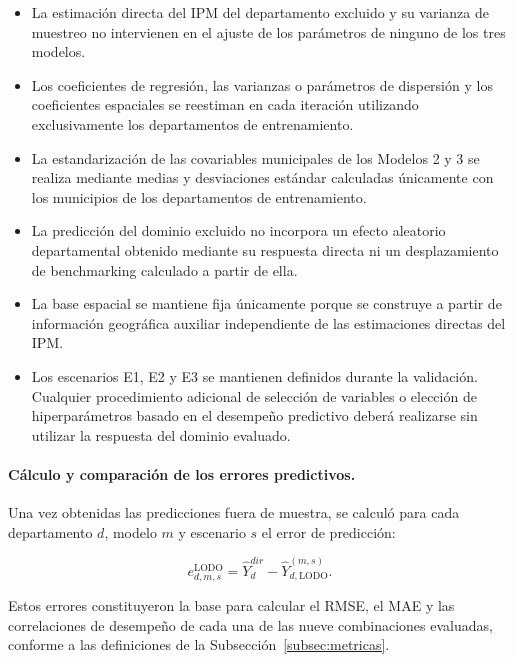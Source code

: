 \begin{itemize}
    \item La estimación directa del IPM del departamento excluido y su varianza de muestreo no intervienen en el ajuste de los parámetros de ninguno de los tres modelos.

    \item Los coeficientes de regresión, las varianzas o parámetros de dispersión y los coeficientes espaciales se reestiman en cada iteración utilizando exclusivamente los departamentos de entrenamiento.

    \item La estandarización de las covariables municipales de los Modelos 2 y 3 se realiza mediante medias y desviaciones estándar calculadas únicamente con los municipios de los departamentos de entrenamiento.

    \item La predicción del dominio excluido no incorpora un efecto aleatorio departamental obtenido mediante su respuesta directa ni un desplazamiento de benchmarking calculado a partir de ella.

    \item La base espacial se mantiene fija únicamente porque se construye a partir de información geográfica auxiliar independiente de las estimaciones directas del IPM.

    \item Los escenarios E1, E2 y E3 se mantienen definidos durante la validación. Cualquier procedimiento adicional de selección de variables o elección de hiperparámetros basado en el desempeño predictivo deberá realizarse sin utilizar la respuesta del dominio evaluado.
\end{itemize}

\paragraph{Cálculo y comparación de los errores predictivos.}

Una vez obtenidas las predicciones fuera de muestra, se calculó para cada departamento $d$, modelo $m$ y escenario $s$ el error de predicción:

\begin{equation}
e_{d,m,s}^{\mathrm{LODO}}
=
\widehat{Y}_d^{dir}
-
\widehat{Y}_{d,\mathrm{LODO}}^{(m,s)}.
\label{eq:error-lodo}
\end{equation}

Estos errores constituyeron la base para calcular el RMSE, el MAE y las correlaciones de desempeño de cada una de las nueve combinaciones evaluadas, conforme a las definiciones de la Subsección~\ref{subsec:metricas}.

